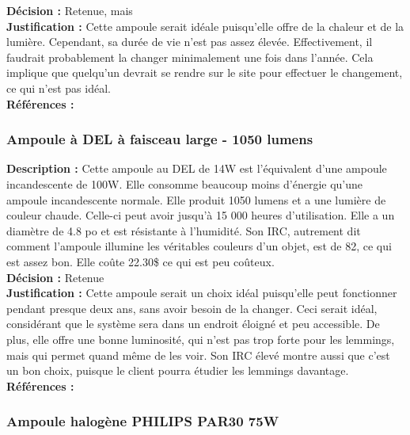 \noindent
\textbf{Décision :} Retenue, mais \\

\noindent
\textbf{Justification :} Cette ampoule serait idéale puisqu’elle offre de
la chaleur et de la lumière. Cependant, sa durée de vie n’est pas assez élevée.
Effectivement, il faudrait probablement la changer minimalement une fois dans
l’année. Cela implique que quelqu’un devrait se rendre sur le site pour
effectuer le changement, ce qui n’est pas idéal. \\

\noindent
\textbf{Références :} \cite{5} \\

\subsubsection{Ampoule à DEL à faisceau large - 1050 lumens}

\noindent
\textbf{Description :} Cette ampoule au DEL de 14W est l’équivalent d’une ampoule
incandescente de 100W. Elle consomme beaucoup moins d’énergie qu’une ampoule
incandescente normale. Elle produit 1050 lumens et a une lumière de couleur
chaude. Celle-ci peut avoir jusqu’à 15 000 heures d’utilisation. Elle a un
diamètre de 4.8 po et est résistante à l’humidité. Son IRC, autrement dit
comment l’ampoule illumine les véritables couleurs d’un objet, est de 82, ce
qui est assez bon. Elle coûte 22.30\$ ce qui est peu coûteux. \\

\noindent
\textbf{Décision :} Retenue \\

\noindent
\textbf{Justification :} Cette ampoule serait un choix idéal puisqu’elle peut
fonctionner pendant presque deux ans, sans avoir besoin de la changer. Ceci
serait idéal, considérant que le système sera dans un endroit éloigné et peu
accessible. De plus, elle offre une bonne luminosité, qui n’est pas trop forte
pour les lemmings, mais qui permet quand même de les voir. Son IRC élevé montre
aussi que c’est un bon choix, puisque le client pourra étudier les lemmings
davantage. \\

\noindent
\textbf{Références :} \cite{6} \\

\subsubsection{Ampoule halogène PHILIPS PAR30 75W}

